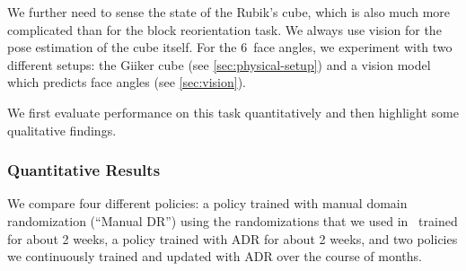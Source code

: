 We further need to sense the state of the Rubik's cube, which is also much more complicated than for the block reorientation task. We always use vision for the pose estimation of the cube itself. For the $6$~face angles, we experiment with two different setups: the Giiker cube (see \autoref{sec:physical-setup}) and a vision model which predicts face angles (see \autoref{sec:vision}).

We first evaluate performance on this task quantitatively and then highlight some qualitative findings.

\subsubsection{Quantitative Results}
We compare four different policies: a policy trained with manual domain randomization (``Manual DR'') using the randomizations that we used in~\cite{openai2018learning} trained for about 2 weeks, a policy trained with ADR for about 2 weeks, and two policies we continuously trained and updated with ADR over the course of months.

